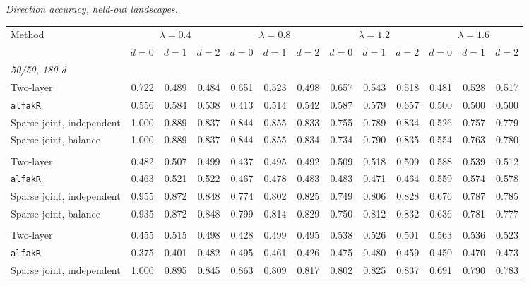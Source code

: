 \noindent\textit{Direction accuracy, held-out landscapes.}
\begin{center}
\scriptsize
\setlength{\tabcolsep}{2.5pt}
\begin{tabular}{l*{12}{r}}
\toprule
Method & \multicolumn{3}{c}{$\lambda=0.4$} & \multicolumn{3}{c}{$\lambda=0.8$} & \multicolumn{3}{c}{$\lambda=1.2$} & \multicolumn{3}{c}{$\lambda=1.6$} \\
\cmidrule(lr){2-4}\cmidrule(lr){5-7}\cmidrule(lr){8-10}\cmidrule(lr){11-13}
 & $d=0$ & $d=1$ & $d=2$ & $d=0$ & $d=1$ & $d=2$ & $d=0$ & $d=1$ & $d=2$ & $d=0$ & $d=1$ & $d=2$ \\
\midrule
\multicolumn{13}{l}{\textit{50/50, 180 d}} \\
\quad Two-layer & 0.722 & 0.489 & 0.484 & 0.651 & 0.523 & 0.498 & 0.657 & 0.543 & 0.518 & 0.481 & 0.528 & 0.517 \\
\quad \texttt{alfakR} & 0.556 & 0.584 & 0.538 & 0.413 & 0.514 & 0.542 & 0.587 & 0.579 & 0.657 & 0.500 & 0.500 & 0.500 \\
\quad Sparse joint, independent & 1.000 & 0.889 & 0.837 & 0.844 & 0.855 & 0.833 & 0.755 & 0.789 & 0.834 & 0.526 & 0.757 & 0.779 \\
\quad Sparse joint, balance & 1.000 & 0.889 & 0.837 & 0.844 & 0.855 & 0.834 & 0.734 & 0.790 & 0.835 & 0.554 & 0.763 & 0.780 \\
\addlinespace[2pt]
\multicolumn{13}{l}{\textit{200/200, 180 d}} \\
\quad Two-layer & 0.482 & 0.507 & 0.499 & 0.437 & 0.495 & 0.492 & 0.509 & 0.518 & 0.509 & 0.588 & 0.539 & 0.512 \\
\quad \texttt{alfakR} & 0.463 & 0.521 & 0.522 & 0.467 & 0.478 & 0.483 & 0.483 & 0.471 & 0.464 & 0.559 & 0.574 & 0.578 \\
\quad Sparse joint, independent & 0.955 & 0.872 & 0.848 & 0.774 & 0.802 & 0.825 & 0.749 & 0.806 & 0.828 & 0.676 & 0.787 & 0.785 \\
\quad Sparse joint, balance & 0.935 & 0.872 & 0.848 & 0.799 & 0.814 & 0.829 & 0.750 & 0.812 & 0.832 & 0.636 & 0.781 & 0.777 \\
\addlinespace[2pt]
\multicolumn{13}{l}{\textit{200/200, 360 d}} \\
\quad Two-layer & 0.455 & 0.515 & 0.498 & 0.428 & 0.499 & 0.495 & 0.538 & 0.526 & 0.501 & 0.563 & 0.536 & 0.523 \\
\quad \texttt{alfakR} & 0.375 & 0.401 & 0.482 & 0.495 & 0.461 & 0.426 & 0.475 & 0.480 & 0.459 & 0.450 & 0.470 & 0.473 \\
\quad Sparse joint, independent & 1.000 & 0.895 & 0.845 & 0.863 & 0.809 & 0.817 & 0.802 & 0.825 & 0.837 & 0.691 & 0.790 & 0.783 \\

\end{tabular}
\end{center}
